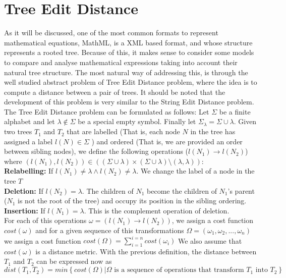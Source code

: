 \section{Tree Edit Distance}
As it will be discussed, one of the most common formats to represent mathematical equations, MathML, is a XML based format, and whose structure represents a rooted tree. Because of this, it makes sense to consider some models to compare and analyse mathematical expressions taking into account their natural tree structure. The most natural way of addressing this, is through the well studied abstract problem of Tree Edit Distance problem, where the idea is to compute a distance between a pair of trees. It should be noted that the development of this problem is very similar to the String Edit Distance problem.
The Tree Edit Distance problem can be formulated as follows:
Let $\Sigma$ be a finite alphabet and let $\lambda \notin \Sigma$ be a special empty symbol. Finally let $\Sigma_\lambda = \Sigma \cup \lambda$. 
Given two trees $T_1$ and $T_2$ that are labelled (That is, each node $N$ in the tree has assigned a label $l(N) \in \Sigma$ ) and ordered (That is, we are provided an order between sibling nodes), we define the following operations ($l(N_1) \rightarrow l(N_2)$) where $(l(N_1),l(N_2)) \in ((\Sigma \cup \lambda)\times(\Sigma \cup \lambda)\setminus(\lambda,\lambda)) $: \\
\textbf{Relabelling:} If $l(N_1) \neq \lambda \wedge l(N_2) \neq \lambda $. We change the label of a node in the tree $T$ \\
\textbf{Deletion:} If $l(N_2) = \lambda $. The children of $N_1$ become the children of $N_1$'s parent ($N_1$ is not the root of the tree) and occupy its position in the sibling ordering. \\
\textbf{Insertion:} If $l(N_1) = \lambda $. This is the complement operation of deletion. \\

For each of this operations $\omega = (l(N_1) \rightarrow l(N_2))$, we assign a cost function $cost(\omega)$ and for a given sequence of this transformations $\Omega = (\omega_1, \omega_2, ... , \omega_n)$ we assign a cost function $cost(\Omega) = \sum_{i=1}^{i=n} {cost(\omega_i)}$ 
We also assume that $cost(\omega)$ is a distance metric. 
With the previous definition, the distance between $T_1$ and $T_2$ can be expressed now as $ dist(T_1, T_2) = min\left\{ cost(\Omega)| \Omega \text{ is a sequence of operations that transform } T_1 \text{ into } T_2 \right\} $

